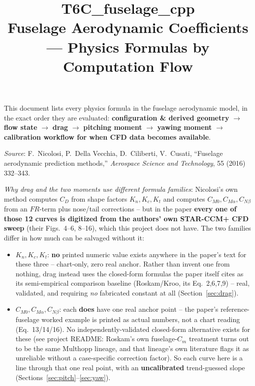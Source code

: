 \documentclass[11pt]{article}
\title{\textbf{T6C\_fuselage\_cpp} \\ \Large Fuselage Aerodynamic Coefficients --- Physics Formulas by Computation Flow}
\author{}
\date{}
\begin{document}
\maketitle
\vspace{-1.5em}

\noindent This document lists every physics formula in the fuselage
aerodynamic model, in the exact order they are evaluated:
\textbf{configuration \& derived geometry} $\to$
\textbf{flow state} $\to$
\textbf{drag} $\to$
\textbf{pitching moment} $\to$
\textbf{yawing moment} $\to$
\textbf{calibration workflow for when CFD data becomes available}.

\medskip
\noindent \textit{Source}: F.~Nicolosi, P.~Della Vecchia, D.~Ciliberti,
V.~Cusati, ``Fuselage aerodynamic prediction methods,'' \emph{Aerospace
Science and Technology}, 55 (2016) 332--343.

\medskip
\noindent \textit{Why drag and the two moments use different formula
families}: Nicolosi's own method computes $C_D$ from shape factors
$K_n,K_c,K_t$ and computes $C_{M0},C_{M\alpha},C_{N\beta}$ from an
$FR$-term plus nose/tail corrections -- but in the paper \textbf{every
one of those 12 curves is digitized from the authors' own STAR-CCM+ CFD
sweep} (their Figs.~4--6, 8--16), which this project does not have.
The two families differ in how much can be salvaged without it:
\begin{itemize}[nosep]
\item $K_n,K_c,K_t$: \textbf{no} printed numeric value exists anywhere
in the paper's text for these three -- chart-only, zero real anchor.
Rather than invent one from nothing, drag instead uses the closed-form
formulas the paper itself cites as its semi-empirical comparison
baseline (Roskam/Kroo, its Eq.~2,6,7,9) -- real, validated, and
requiring \emph{no} fabricated constant at all (Section~\ref{sec:drag}).
\item $C_{M0},C_{M\alpha},C_{N\beta}$: each \textbf{does} have one real
anchor point -- the paper's reference-fuselage worked example is
printed as actual numbers, not a chart reading (Eq.~13/14/16). No
independently-validated closed-form alternative exists for these (see
project README: Roskam's own fuselage-$C_m$ treatment turns out to be
the same Multhopp lineage, and that lineage's own literature flags it
as unreliable without a case-specific correction factor). So each curve
here is a line through that one real point, with an
\textbf{uncalibrated} trend-guessed slope (Sections~\ref{sec:pitch}--\ref{sec:yaw}).
\end{itemize}
\end{document}
